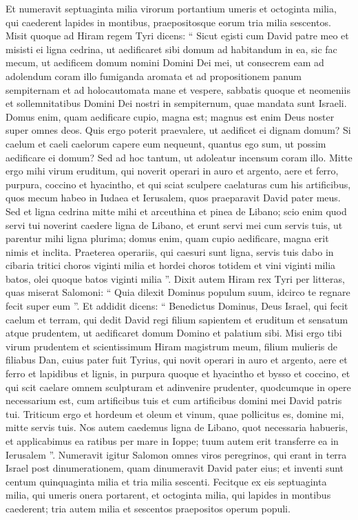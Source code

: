 \begin{biblechapter}
\begin{biblechapter}
\verse Et numeravit septuaginta milia virorum portantium umeris et octoginta milia, qui caederent lapides in montibus, praepositosque eorum tria milia sescentos.
 \verse Misit quoque ad Hiram regem Tyri dicens: “ Sicut egisti cum David patre meo et misisti ei ligna cedrina, ut aedificaret sibi domum ad habitandum in ea, 
\verse sic fac mecum, ut aedificem domum nomini Domini Dei mei, ut consecrem eam ad adolendum coram illo fumiganda aromata et ad propositionem panum sempiternam et ad holocautomata mane et vespere, sabbatis quoque et neomeniis et sollemnitatibus Domini Dei nostri in sempiternum, quae mandata sunt Israeli. 
 \verse Domus enim, quam aedificare cupio, magna est; magnus est enim Deus noster super omnes deos. 
\verse Quis ergo poterit praevalere, ut aedificet ei dignam domum? Si caelum et caeli caelorum capere eum nequeunt, quantus ego sum, ut possim aedificare ei domum? Sed ad hoc tantum, ut adoleatur incensum coram illo. 
 \verse Mitte ergo mihi virum eruditum, qui noverit operari in auro et argento, aere et ferro, purpura, coccino et hyacintho, et qui sciat sculpere caelaturas cum his artificibus, quos mecum habeo in Iudaea et Ierusalem, quos praeparavit David pater meus. 
\verse Sed et ligna cedrina mitte mihi et arceuthina et pinea de Libano; scio enim quod servi tui noverint caedere ligna de Libano, et erunt servi mei cum servis tuis, 
\verse ut parentur mihi ligna plurima; domus enim, quam cupio aedificare, magna erit nimis et inclita. 
\verse Praeterea operariis, qui caesuri sunt ligna, servis tuis dabo in cibaria tritici choros viginti milia et hordei choros totidem et vini viginti milia batos, olei quoque batos viginti milia ”.
 \verse Dixit autem Hiram rex Tyri per litteras, quas miserat Salomoni: “ Quia dilexit Dominus populum suum, idcirco te regnare fecit super eum ”. 
\verse Et addidit dicens: “ Benedictus Dominus, Deus Israel, qui fecit caelum et terram, qui dedit David regi filium sapientem et eruditum et sensatum atque prudentem, ut aedificaret domum Domino et palatium sibi. 
\verse Misi ergo tibi virum prudentem et scientissimum Hiram magistrum meum, 
\verse filium mulieris de filiabus Dan, cuius pater fuit Tyrius, qui novit operari in auro et argento, aere et ferro et lapidibus et lignis, in purpura quoque et hyacintho et bysso et coccino, et qui scit caelare omnem sculpturam et adinvenire prudenter, quodcumque in opere necessarium est, cum artificibus tuis et cum artificibus domini mei David patris tui. 
\verse Triticum ergo et hordeum et oleum et vinum, quae pollicitus es, domine mi, mitte servis tuis. 
\verse Nos autem caedemus ligna de Libano, quot necessaria habueris, et applicabimus ea ratibus per mare in Ioppe; tuum autem erit transferre ea in Ierusalem ”.
 \verse Numeravit igitur Salomon omnes viros peregrinos, qui erant in terra Israel post dinumerationem, quam dinumeravit David pater eius; et inventi sunt centum quinquaginta milia et tria milia sescenti. 
\verse Fecitque ex eis septuaginta milia, qui umeris onera portarent, et octoginta milia, qui lapides in montibus caederent; tria autem milia et sescentos praepositos operum populi.
 

\end{biblechapter}
\end{biblechapter}
